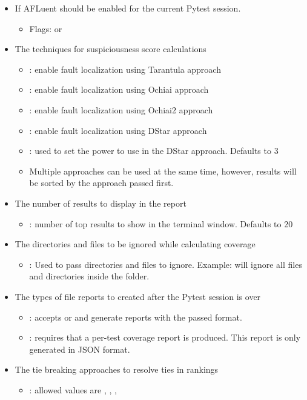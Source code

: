 \begin{itemize}
    \item If AFLuent should be enabled for the current Pytest session.
    \begin{itemize}
        \item Flags:  or 
    \end{itemize}
    \item The techniques for suspiciousness score calculations
    \begin{itemize}
        \item {}: enable fault localization using Tarantula approach
        \item {}: enable fault localization using Ochiai approach
        \item {}: enable fault localization using Ochiai2 approach
        \item {}: enable fault localization using DStar approach
        \item {}: used to set the power to use in the DStar
        approach. Defaults to 3
        \item Multiple approaches can be used at the same time, however, results
        will be sorted by the approach passed first.
    \end{itemize}
    \item The number of results to display in the report
    \begin{itemize}
        \item {}: number of top results to show in the
        terminal window. Defaults to 20
    \end{itemize}
    \item The directories and files to be ignored while calculating coverage
    \begin{itemize}
        \item {}: Used to pass directories and files to
        ignore. Example:  will ignore all files and directories
        inside the  folder.
    \end{itemize}
    \item The types of file reports to created after the Pytest session is over
    \begin{itemize}
        \item {}: accepts  or  and generate
        reports with the passed format.
        \item {}: requires that a per-test coverage
        report is produced. This report is only generated in JSON format.
    \end{itemize}
    \item The tie breaking approaches to resolve ties in rankings
    \begin{itemize}
        \item {}: allowed values are ,
        , ,


\end{itemize}
\end{itemize}
